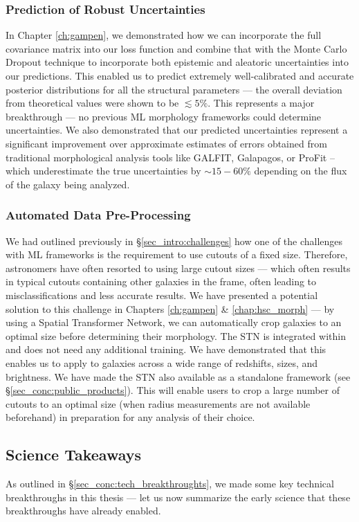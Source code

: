 \subsubsection{Prediction of Robust Uncertainties}
In Chapter \ref{ch:gampen}, we demonstrated how we can incorporate the full covariance matrix into our loss function and combine that with the Monte Carlo Dropout technique to incorporate both epistemic and aleatoric uncertainties into our predictions. This enabled us to predict extremely well-calibrated and accurate posterior distributions for all the structural parameters --- the overall deviation from theoretical values were shown to be $\lesssim 5\%$. This represents a major breakthrough --- no previous ML morphology frameworks could determine uncertainties. We also demonstrated that our predicted uncertainties represent a significant improvement over approximate estimates of errors obtained from traditional morphological analysis tools like GALFIT, Galapagos, or ProFit -- which underestimate the true uncertainties by $\sim15-60\%$ depending on the flux of the galaxy being analyzed. 


\subsubsection{Automated Data Pre-Processing} 
We had outlined previously in \S \ref{sec_intro:challenges} how one of the challenges with ML frameworks is the requirement to use cutouts of a fixed size. Therefore, astronomers have often resorted to using large cutout sizes --- which often results in typical cutouts containing other galaxies in the frame, often leading to misclassifications and less accurate results. We have presented a potential solution to this challenge in Chapters \ref{ch:gampen} \& \ref{chap:hsc_morph} --- by using a Spatial Transformer Network, we can automatically crop galaxies to an optimal size before determining their morphology. The STN is integrated within \gampen{} and does not need any additional training. We have demonstrated that this enables us to apply \gampen{} to galaxies across a wide range of redshifts, sizes, and brightness. We have made the STN also available as a standalone framework (see \S \ref{sec_conc:public_products}). This will enable users to crop a large number of cutouts to an optimal size (when radius measurements are not available beforehand) in preparation for any analysis of their choice.  

\subsection{Science Takeaways} \label{sec_conc:science_takeaways}
As outlined in \S \ref{sec_conc:tech_breakthroughts}, we made some key technical breakthroughs in this thesis --- let us now summarize the early science that these breakthroughs have already enabled. 

